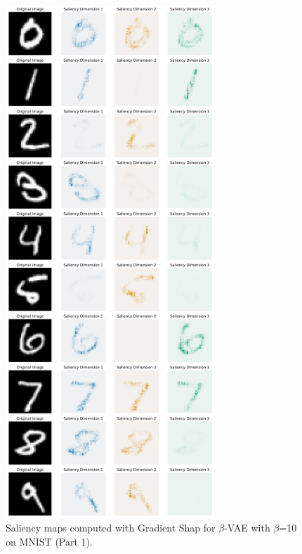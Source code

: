 \begin{figure}[h]
\centering
    \includegraphics[width=0.7\textwidth]{images/vae/beta_vae_10_sms_mnist_1.PNG}
\caption{Saliency maps computed with Gradient Shap for $\beta$-VAE with  $\beta$=10 on MNIST (Part 1).}\label{fig:betavae10smsmnist1}
\end{figure}


